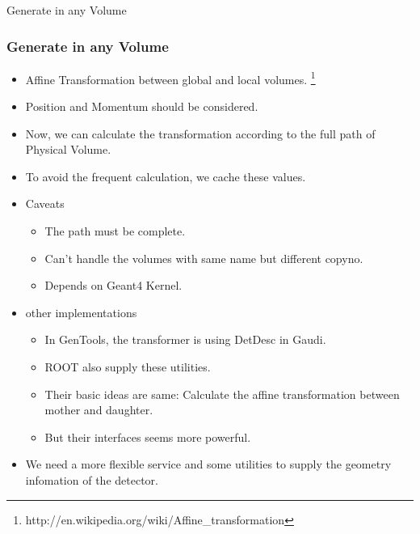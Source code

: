 \begin{frame}
    \begin{center}
        \LARGE Generate in any Volume
    \end{center}
\end{frame}

\begin{frame}
    \frametitle{Generate in any Volume}
    \begin{itemize}
        \item Affine Transformation between global and local volumes.
            \footnote{http://en.wikipedia.org/wiki/Affine\_transformation}
        \item Position and Momentum should be considered.
        \item Now, we can calculate the transformation according to 
              the full path of Physical Volume.
        \item To avoid the frequent calculation, we cache these values.
        \item Caveats
            \begin{itemize}
                \item The path must be complete.
                \item Can't handle the volumes with same name 
                        but different copyno.
                \item Depends on Geant4 Kernel.
            \end{itemize}
        \item other implementations
            \begin{itemize}
                \item In GenTools, the transformer is using DetDesc in Gaudi.
                \item ROOT also supply these utilities.
                \item Their basic ideas are same: Calculate the affine
                    transformation between mother and daughter.
                \item But their interfaces seems more powerful.
            \end{itemize}
        \item We need a more flexible service and some utilities 
            to supply the geometry infomation of the detector.
            
    \end{itemize}
\end{frame}

